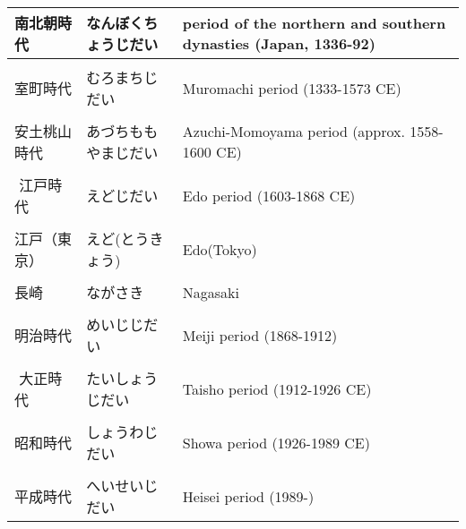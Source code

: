 \documentclass{article}
\begin{document}
\begin{tabular}{l | l | p{10.5cm}}
南北朝時代 & なんぼくちょうじだい & period of the northern and southern dynasties (Japan, 1336-92)​ \\ \hline \\[-1em]
室町時代 & むろまちじだい & Muromachi period (1333-1573 CE)​ \\ \hline \\[-1em]
安土桃山時代 & あづちももやまじだい & Azuchi-Momoyama period (approx. 1558-1600 CE) \\ \hline \\[-1em]​
江戸時代 & えどじだい & Edo period (1603-1868 CE)​ \\ \hline \\[-1em]
江戸（東京） & えど(とうきょう) & Edo(Tokyo) \\ \hline \\[-1em]
長崎 & ながさき & Nagasaki \\ \hline \\[-1em]
明治時代 & めいじじだい & Meiji period (1868-1912) \\ \hline \\[-1em]​
大正時代 & たいしょうじだい & Taisho period (1912-1926 CE)​ \\ \hline \\[-1em]
昭和時代 & しょうわじだい & Showa period (1926-1989 CE)​ \\ \hline \\[-1em]
平成時代 & へいせいじだい & Heisei period (1989-)​ %
\end{tabular}
\end{document}
